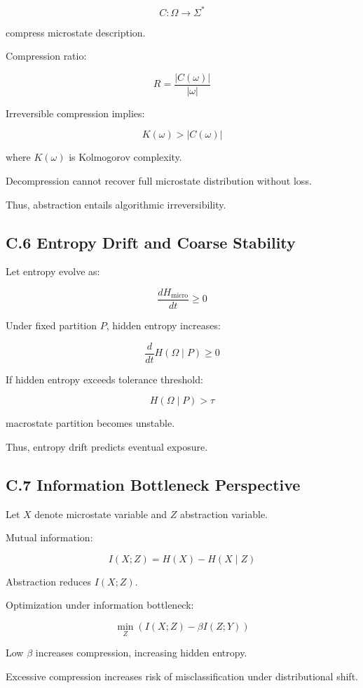 \documentclass[11pt,openany]{book}
\begin{document}
\[
C : \Omega \to \Sigma^*
\]

compress microstate description.

Compression ratio:

\[
R = \frac{|C(\omega)|}{|\omega|}
\]

Irreversible compression implies:

\[
K(\omega) > |C(\omega)|
\]

where $K(\omega)$ is Kolmogorov complexity.

Decompression cannot recover full microstate distribution without loss.

Thus, abstraction entails algorithmic irreversibility.

\subsection{C.6 Entropy Drift and Coarse Stability}

Let entropy evolve as:

\[
\frac{dH_{\text{micro}}}{dt} \ge 0
\]

Under fixed partition $P$, hidden entropy increases:

\[
\frac{d}{dt} H(\Omega \mid P) \ge 0
\]

If hidden entropy exceeds tolerance threshold:

\[
H(\Omega \mid P) > \tau
\]

macrostate partition becomes unstable.

Thus, entropy drift predicts eventual exposure.

\subsection{C.7 Information Bottleneck Perspective}

Let $X$ denote microstate variable and $Z$ abstraction variable.

Mutual information:

\[
I(X;Z)
=
H(X) - H(X \mid Z)
\]

Abstraction reduces $I(X;Z)$.

Optimization under information bottleneck:

\[
\min_{Z}
\left(
I(X;Z) - \beta I(Z;Y)
\right)
\]

Low $\beta$ increases compression, increasing hidden entropy.

Excessive compression increases risk of misclassification under distributional shift.
\end{document}
